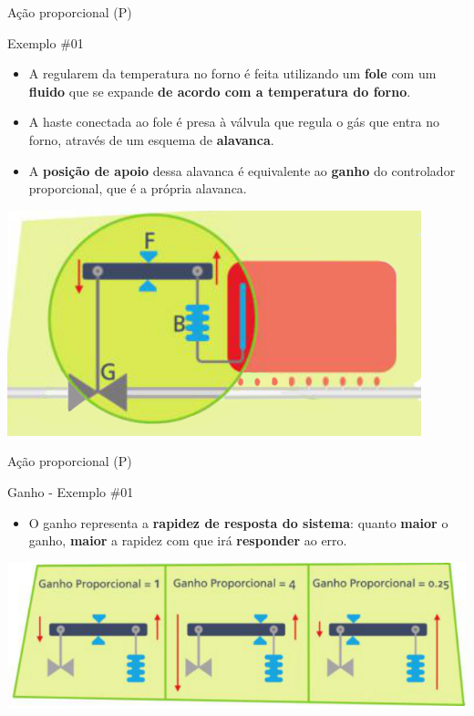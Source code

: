 \begin{frame}{Ação proporcional (P)}
	\begin{block}{Exemplo \#01}
		\begin{itemize}
			\item A regularem da temperatura no forno é feita utilizando um \textbf{fole} com um \textbf{fluido} que se expande \textbf{de acordo com a temperatura do forno}.
			\item A haste conectada ao fole é presa à válvula que regula o gás que entra no forno, através de um esquema de \textbf{alavanca}.
			\item A \textbf{posição de apoio} dessa alavanca é equivalente ao \textbf{ganho} do controlador proporcional, que é a própria alavanca.
		\end{itemize}
	\end{block}

	\medskip

	\centering
	\includegraphics[height=0.3\textheight]{Figuras/Ch12/fig4n1}
\end{frame}


\begin{frame}{Ação proporcional (P)}
	\begin{block}{Ganho - Exemplo \#01}
		\begin{itemize}
			\item O ganho representa a \textbf{rapidez de resposta do sistema}: quanto \textbf{maior} o ganho, \textbf{maior} a rapidez com que irá \textbf{responder} ao erro.
		\end{itemize}
	\end{block}

	\bigskip
	
	\centering
	\includegraphics[width=0.9\linewidth]{Figuras/Ch12/fig4n2}
\end{frame}



